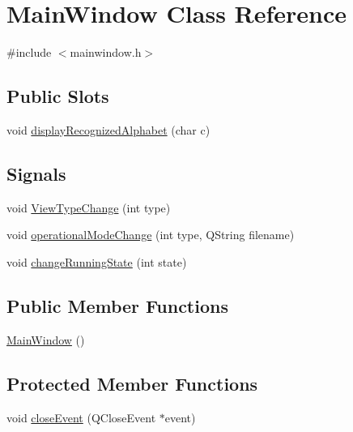 \hypertarget{classMainWindow}{
\section{MainWindow Class Reference}
\label{classMainWindow}
}


{\ttfamily \#include $<$mainwindow.h$>$}

\subsection*{Public Slots}
\begin{DoxyCompactItemize}
\item 
void \hyperlink{classMainWindow_a6c232109b263942229aa84d55924f8a3}{displayRecognizedAlphabet} (char c)
\end{DoxyCompactItemize}
\subsection*{Signals}
\begin{DoxyCompactItemize}
\item 
void \hyperlink{classMainWindow_af583ca0e72c1f9583906ae3ead0555e9}{ViewTypeChange} (int type)
\item 
void \hyperlink{classMainWindow_aa33e1f745d6203631229f131a9a06baa}{operationalModeChange} (int type, QString filename)
\item 
void \hyperlink{classMainWindow_a43d9aff77dbdddacefda5c8eb43ffae2}{changeRunningState} (int state)
\end{DoxyCompactItemize}
\subsection*{Public Member Functions}
\begin{DoxyCompactItemize}
\item 
\hyperlink{classMainWindow_a34c4b4207b46d11a4100c9b19f0e81bb}{MainWindow} ()
\end{DoxyCompactItemize}
\subsection*{Protected Member Functions}
\begin{DoxyCompactItemize}
\item 
void \hyperlink{classMainWindow_a4e20a4a065fbb0e4d3532a45a0a91425}{closeEvent} (QCloseEvent $\ast$event)
\end{DoxyCompactItemize}
